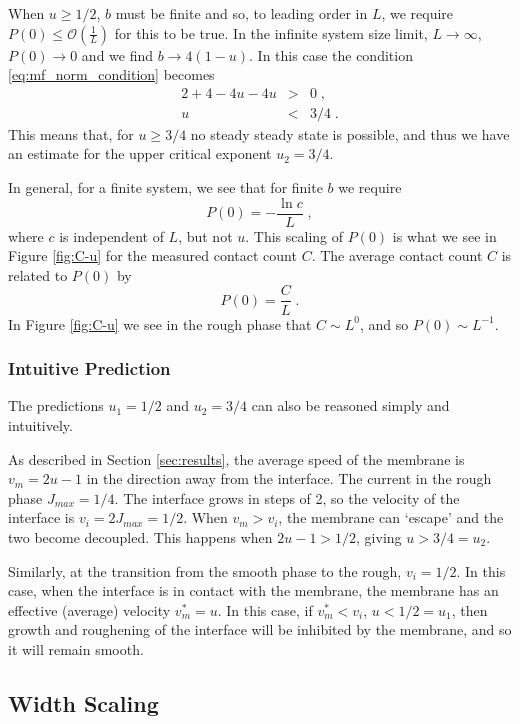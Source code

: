 \documentclass[a4paper,10pt]{article}
\newcommand{\fref}[1]{Figure \ref{#1}}
\newcommand{\sref}[1]{Section \ref{#1}}
\newcommand{\Or}{\mathcal{O}}
\newcommand{\OL}{\Or\left(\frac{1}{L}\right)}
\begin{document}
When $u\ge 1/2$, $b$ must be finite and so, to leading order in $L$, we require $P(0)\le\OL$ for this to be true. In the infinite system size limit, $L\to\infty$, $P(0) \to 0$ and we find $b \to 4(1-u)$. In this case the condition \eqref{eq:mf_norm_condition} becomes
\begin{eqnarray}
  2 + 4 - 4u - 4 u & > & 0  \;,\nonumber \\
                 u & < & 3/4 \;. 
\end{eqnarray}
This means that, for $u \ge 3/4$ no steady steady state is possible, and thus we have an estimate for the upper critical exponent $u_2 = 3/4$.

In general, for a finite system, we see that for finite $b$ we require
\begin{equation}
 P(0) = - \frac{\ln c}{L} \;, 
\end{equation}
where $c$ is independent of $L$, but not $u$. This scaling of $P(0)$ is what we see in \fref{fig:C-u} for the measured contact count $C$. The average contact count $C$ is related to $P(0)$ by
\begin{equation}\label{eq:P0_L}
  P(0) = \frac{C}{L} \;.
\end{equation}
In \fref{fig:C-u} we see in the rough phase that $C \sim L^0$, and so $P(0) \sim L^{-1}$.

\subsubsection{Intuitive Prediction}

The predictions $u_1 = 1/2$ and $u_2 = 3/4$ can also be reasoned simply and intuitively. 

As described in \sref{sec:results}, the average speed of the membrane is $v_m = 2u-1$ in the direction away from the interface. The current in the rough phase $J_{max}=1/4$. The interface grows in steps of 2, so the velocity of the interface is $v_i = 2J_{max} = 1/2$. When $v_m > v_i$, the membrane can `escape' and the two become decoupled. This happens when $2u-1 > 1/2$, giving $u > 3/4 = u_2$.

Similarly, at the transition from the smooth phase to the rough, $v_i = 1/2$. In this case, when the interface is in contact with the membrane, the membrane has an effective (average) velocity $v^*_m = u $. In this case, if $v^*_m < v_i$, $u < 1/2 = u_1$, then growth and roughening of the interface will be inhibited by the membrane, and so it will remain smooth. 


\subsection{Width Scaling}
\end{document}
